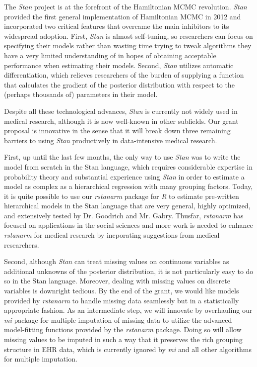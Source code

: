 \documentclass[11pt,notitlepage]{article}
\begin{document}
The \textit{Stan} project is at the forefront of the Hamiltonian MCMC revolution.
\textit{Stan} provided the first general implementation of Hamiltonian MCMC in 2012 and
incorporated two critical features that overcame the main inhibitors to its widespread
adoption. First, \textit{Stan} is almost self-tuning, so
researchers can focus on specifying their models rather than wasting time trying to
tweak algorithms they have a very limited understanding of in hopes of obtaining 
acceptable performance when estimating their models. Second, \textit{Stan} utilizes
automatic differentiation, which relieves researchers of the burden of supplying
a function that calculates the gradient of the posterior distribution with respect
to the (perhaps thousands of) parameters in their model.

Despite all these technological advances, \textit{Stan} is currently not widely used
in medical research, although it is now well-known in other subfields. Our grant
proposal is innovative in the sense that it will break down three remaining barriers
to using \textit{Stan} productively in data-intensive medical research. 

First, up until the last few months, the only way to use \textit{Stan} was to write the 
model from scratch in the Stan language, which requires considerable expertise in 
probability theory and substantial experience using \textit{Stan} in order to estimate
a model as complex as a hierarchical regression with many grouping factors. Today, it
is quite possible to use our \textit{rstanarm} package for \textit{R} to estimate
pre-written hierarchical models in the Stan language that are very general, highly
optimized, and extensively tested by Dr. Goodrich and Mr. Gabry. Thusfar, \textit{rstanarm}
has focused on applications in the social sciences and more work is needed to enhance
\textit{rstanarm} for medical research by incporating suggestions from medical researchers.

Second, although \textit{Stan} can treat missing values on continuous variables as 
additional unknowns of the posterior distribution, it is not particularly easy to do so
in the Stan language. Moreover, dealing with missing values on discrete variables is
downright tedious. By the end of the grant, we would like models provided by 
\textit{rstanarm} to handle missing data seamlessly but in a statistically appropriate
fashion. As an intermediate step, we will innovate by overhauling our \textit{mi}
package for multiple imputation of missing data to utilize the advanced model-fitting
functions provided by the \textit{rstanarm} package. Doing so will allow missing values
to be imputed in such a way that it preserves the rich grouping structure in EHR data, 
which is currently ignored by \textit{mi} and all other algorithms for multiple imputation.
\end{document}
